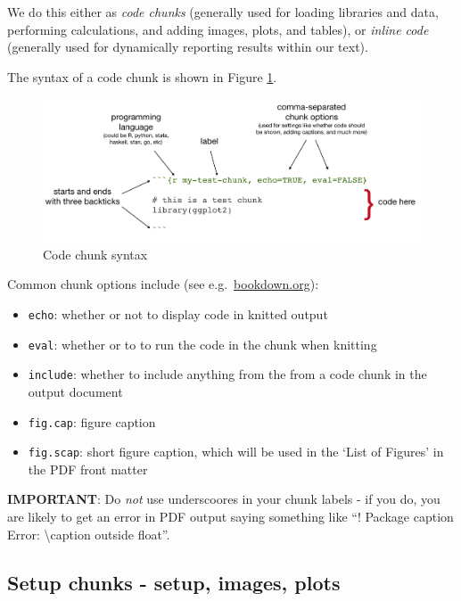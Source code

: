 \documentclass[a4paper, nobind]{templates/ociamthesis}
\providecommand{\tightlist}{%
  \setlength{\itemsep}{0pt}\setlength{\parskip}{0pt}}
\begin{document}
We do this either as \emph{code chunks} (generally used for loading libraries and data, performing calculations, and adding images, plots, and tables), or \emph{inline code} (generally used for dynamically reporting results within our text).

The syntax of a code chunk is shown in Figure \ref{fig:chunk-parts}.

\begin{figure}[H]
\includegraphics[width=1\linewidth]{figures/sample-content/chunk-parts} \caption{Code chunk syntax}\label{fig:chunk-parts}
\end{figure}

Common chunk options include (see e.g.~\href{https://bookdown.org/yihui/rmarkdown/r-code.html}{bookdown.org}):

\begin{itemize}
\tightlist
\item
  \texttt{echo}: whether or not to display code in knitted output
\item
  \texttt{eval}: whether or to to run the code in the chunk when knitting
\item
  \texttt{include}: whether to include anything from the from a code chunk in the output document
\item
  \texttt{fig.cap}: figure caption
\item
  \texttt{fig.scap}: short figure caption, which will be used in the `List of Figures' in the PDF front matter
\end{itemize}

\textbf{IMPORTANT}: Do \emph{not} use underscoores in your chunk labels - if you do, you are likely to get an error in PDF output saying something like ``! Package caption Error: \textbackslash caption outside float''.

\hypertarget{setup-chunks---setup-images-plots}{%
\subsection{Setup chunks - setup, images, plots}\label{setup-chunks---setup-images-plots}}
\end{document}
